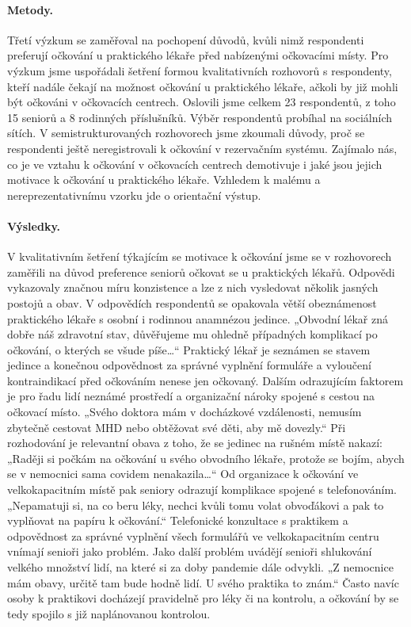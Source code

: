 \paragraph*{Metody.}
Třetí výzkum se zaměřoval na pochopení důvodů, kvůli nimž respondenti preferují očkování u praktického lékaře před nabízenými očkovacími místy. Pro výzkum jsme uspořádali šetření formou kvalitativních rozhovorů s respondenty, kteří nadále čekají na možnost očkování u praktického lékaře, ačkoli by již mohli být očkováni v očkovacích centrech. Oslovili jsme celkem 23 respondentů, z toho 15 seniorů a 8 rodinných příslušníků. Výběr respondentů probíhal na sociálních sítích. V semistrukturovaných rozhovorech jsme zkoumali důvody, proč se respondenti ještě neregistrovali k očkování v rezervačním systému. Zajímalo nás, co je ve vztahu k očkování v očkovacích centrech demotivuje i jaké jsou jejich motivace k očkování u praktického lékaře. Vzhledem k malému a nereprezentativnímu vzorku jde o orientační výstup. 
 
\paragraph*{Výsledky.}
V kvalitativním šetření týkajícím se motivace k očkování jsme se v rozhovorech zaměřili na důvod preference seniorů očkovat se u praktických lékařů. Odpovědi vykazovaly značnou míru konzistence a lze z nich vysledovat několik jasných postojů a obav.
V odpovědích respondentů se opakovala větší obeznámenost praktického lékaře s osobní i rodinnou anamnézou jedince. „Obvodní lékař zná dobře náš zdravotní stav, důvěřujeme mu ohledně případných komplikací po očkování, o kterých se všude píše…“ Praktický lékař je seznámen se stavem jedince a konečnou odpovědnost za správné vyplnění formuláře a vyloučení kontraindikací před očkováním nenese jen očkovaný. 
Dalším odrazujícím faktorem je pro řadu lidí neznámé prostředí a organizační nároky spojené s cestou na očkovací místo. „Svého doktora mám v docházkové vzdálenosti, nemusím zbytečně cestovat MHD nebo obtěžovat své děti, aby mě dovezly.“ Při rozhodování je relevantní obava z toho, že se jedinec na rušném místě nakazí: „Raději si počkám na očkování u svého obvodního lékaře, protože se bojím, abych se v nemocnici sama covidem nenakazila…“
Od organizace k očkování ve velkokapacitním místě pak seniory odrazují komplikace spojené s telefonováním. „Nepamatuji si, na co beru léky, nechci kvůli tomu volat obvoďákovi a pak to vyplňovat na papíru k očkování.“ Telefonické konzultace s praktikem a odpovědnost za správné vyplnění všech formulářů ve velkokapacitním centru vnímají senioři jako problém. Jako další problém uvádějí senioři shlukování velkého množství lidí, na které si za doby pandemie dále odvykli. „Z nemocnice mám obavy, určitě tam bude hodně lidí. U svého praktika to znám.“ Často navíc osoby k praktikovi docházejí pravidelně pro léky či na kontrolu, a očkování by se tedy spojilo s již naplánovanou kontrolou.

